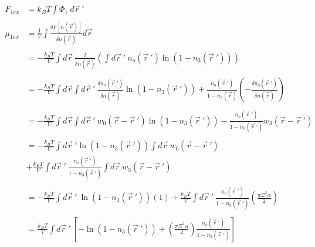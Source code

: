 \documentclass[double,12pt]{revtex4-2}
\begin{document}
\begin{align}
    F_{1ex} &= k_BT\int \Phi_1~d\vec r~' \\ \nonumber\\
    \mu_{1ex} &= \frac{1}{V}\int \frac{\delta F[n(\vec r)]}{\delta n(\vec r)} d\vec r \\ \nonumber\\
%
        &= -\frac{k_BT}{V} \int d\vec r ~\frac{\delta}
        {\delta n(\vec r)}\left(\int d\vec r~'~n_o(\vec r~')\ln(1-n_3(\vec r~'))\right) \\ \nonumber\\
%
        &= -\frac{k_BT}{V}\int d\vec r\int d\vec r~'~\frac{\delta n_o(\vec r~')}
        {\delta n(\vec r)}\ln(1-n_3(\vec r~'))+\frac{n_o(\vec r~')}
          {1-n_3(\vec r)}\left(-\frac{\delta n_3(\vec r~')}{\delta n(\vec r)}
          \right) \\ \nonumber\\
%
        &= -\frac{k_BT}{V} \int d\vec r \int d\vec r~' ~w_0(\vec r - \vec r~')
          \ln(1-n_3(\vec r~')) - \frac{n_o(\vec r~')}
          {1-n_3(\vec r~')}w_3(\vec r - \vec r~') \\ \nonumber\\
%
        &= -\frac{k_BT}{V} \int d\vec r~'\ln(1-n_3(\vec r~')) \int d \vec r  
          ~w_0(\vec r - \vec r~') \nonumber\\
        &+ \frac{k_BT}{V} \int d\vec r~' ~\frac{n_o(\vec r~')}{1-n_3(\vec r~')} 
          \int d \vec r~w_3(\vec r - \vec r~')  \\ \\
%
        &= -\frac{k_BT}{V} \int d\vec r~' ~\ln(1-n_3(\vec r~'))(1)
          + \frac{k_BT}{V} \int d\vec r~' ~\frac{n_o(\vec r~')}{1-n_3(\vec r~')}
          \left(\frac{\pi\Xi^2\alpha}{2}\right) \\ \\
%
        &= \frac{k_BT}{V}\int d\vec r~'~ \left[-\ln(1-n_3(\vec r~'))+\left(
        \frac{\pi\Xi^2\alpha}{2}\right)\frac{n_o(\vec r~')}{1-n_3(\vec r~')}\right]
\end{align}
\end{document}
